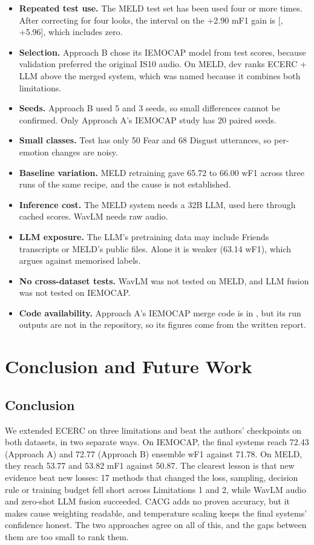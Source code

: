 \documentclass[11pt,a4paper]{article}
\newcommand{\mn}{\textminus}
\begin{document}
\begin{itemize}
  \item \textbf{Repeated test use.} The MELD test set has been used four or more times. After correcting for four looks, the interval on the +2.90 mF1 gain is [\mn0.30, +5.96], which includes zero.
  \item \textbf{Selection.} Approach B chose its IEMOCAP model from test scores, because validation preferred the original IS10 audio. On MELD, dev ranks ECERC + LLM above the merged system, which was named because it combines both limitations.
  \item \textbf{Seeds.} Approach B used 5 and 3 seeds, so small differences cannot be confirmed. Only Approach A's IEMOCAP study has 20 paired seeds.
  \item \textbf{Small classes.} Test has only 50 Fear and 68 Disgust utterances, so per-emotion changes are noisy.
  \item \textbf{Baseline variation.} MELD retraining gave 65.72 to 66.00 wF1 across three runs of the same recipe, and the cause is not established.
  \item \textbf{Inference cost.} The MELD system needs a 32B LLM, used here through cached scores. WavLM needs raw audio.
  \item \textbf{LLM exposure.} The LLM's pretraining data may include Friends transcripts or MELD's public files. Alone it is weaker (63.14 wF1), which argues against memorised labels.
  \item \textbf{No cross-dataset tests.} WavLM was not tested on MELD, and LLM fusion was not tested on IEMOCAP.
  \item \textbf{Code availability.} Approach A's IEMOCAP merge code is in , but its run outputs are not in the repository, so its figures come from the written report.
\end{itemize}

\section{Conclusion and Future Work}
\label{sec:conclusion}

\subsection{Conclusion}

We extended ECERC on three limitations and beat the authors' checkpoints on both datasets, in two separate ways. On IEMOCAP, the final systems reach 72.43 (Approach A) and 72.77 (Approach B) ensemble wF1 against 71.78. On MELD, they reach 53.77 and 53.82 mF1 against 50.87. The clearest lesson is that new evidence beat new losses: 17 methods that changed the loss, sampling, decision rule or training budget fell short across Limitations 1 and 2, while WavLM audio and zero-shot LLM fusion succeeded. CACG adds no proven accuracy, but it makes cause weighting readable, and temperature scaling keeps the final systems' confidence honest. The two approaches agree on all of this, and the gaps between them are too small to rank them.
\end{document}
